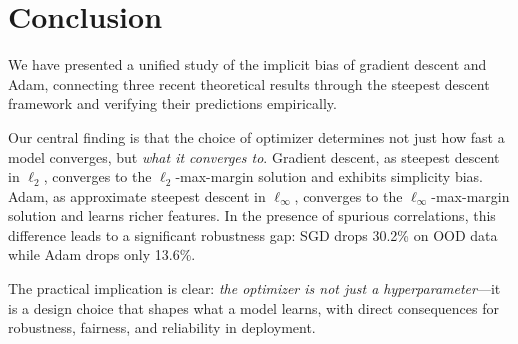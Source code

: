 \documentclass{article}
\begin{document}
\section{Conclusion}
\label{sec:conclusion}

We have presented a unified study of the implicit bias of gradient descent and Adam, connecting three recent theoretical results through the steepest descent framework and verifying their predictions empirically.

Our central finding is that the choice of optimizer determines not just how fast a model converges, but \emph{what it converges to}. Gradient descent, as steepest descent in $\ell_2$, converges to the $\ell_2$-max-margin solution and exhibits simplicity bias. Adam, as approximate steepest descent in $\ell_\infty$, converges to the $\ell_\infty$-max-margin solution and learns richer features. In the presence of spurious correlations, this difference leads to a significant robustness gap: SGD drops 30.2\% on OOD data while Adam drops only 13.6\%.

The practical implication is clear: \emph{the optimizer is not just a hyperparameter}---it is a design choice that shapes what a model learns, with direct consequences for robustness, fairness, and reliability in deployment.

\end{document}
